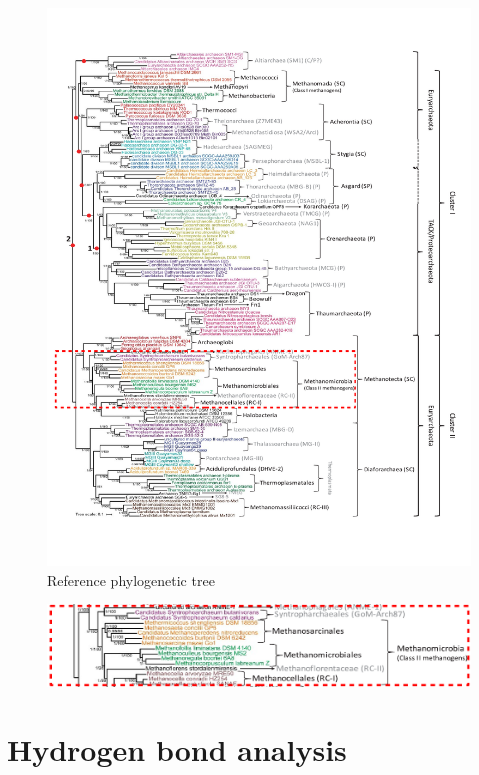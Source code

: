 \documentclass[fontsize=12pt,headsepline=true, bibliography=totocnumbered, twoside]{scrbook} %
\begin{document}
\begin{figure}[]
\center
\includegraphics[scale=0.6]{tree2}
\caption[Reference phylogenetic tree]{Reference phylogenetic tree \citep{adam2017growing}}
\label{ptreeref}
\end{figure}





\begin{figure}[]
\ContinuedFloat
\center
\includegraphics[scale=0.52]{tree3}
\caption*{}
\end{figure}


\section{Hydrogen bond analysis}
\end{document}
